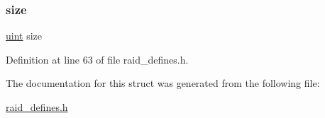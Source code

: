 \mbox{\label{structfile__s_a22d26304a3b3aca97e6311f6939dd1bf}} 
\subsubsection{\texorpdfstring{size}{size}}
{\footnotesize\ttfamily \hyperlink{raid__defines_8h_a91ad9478d81a7aaf2593e8d9c3d06a14}{uint} size}



Definition at line 63 of file raid\+\_\+defines.\+h.



The documentation for this struct was generated from the following file\+:\begin{DoxyCompactItemize}
\item 
\hyperlink{raid__defines_8h}{raid\+\_\+defines.\+h}\end{DoxyCompactItemize}
